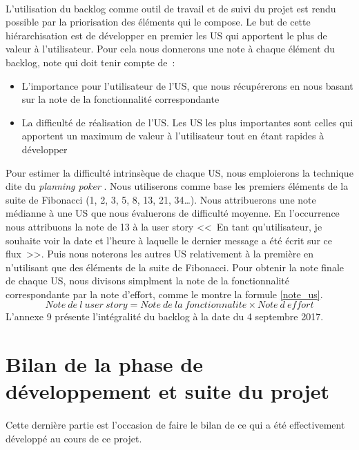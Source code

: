 			\paragraph{}%
			L'utilisation du backlog comme outil de travail et de suivi du projet est
			rendu possible par la priorisation des éléments qui le compose. Le but de
			cette hiérarchisation est de développer en premier les US qui
			apportent le plus de valeur à l'utilisateur. Pour cela nous donnerons
			une note à chaque élément du backlog, note qui doit tenir compte de~:
			\begin{itemize}
			  \item L'importance pour l'utilisateur de l'US, que nous
			  récupérerons en nous basant sur la note de la fonctionnalité correspondante
			  \item La difficulté de réalisation de l'US. Les US les
			  plus importantes sont celles qui apportent un maximum de valeur à
			  l'utilisateur tout en étant rapides à développer
			\end{itemize}
			Pour estimer la difficulté intrinsèque de chaque US,
			nous emploierons la technique dite du \textit{planning poker}
			\citep{aubry_scrum_2015}. Nous utiliserons comme base les premiers éléments
			de la suite de Fibonacci (1, 2, 3, 5, 8, 13, 21, 34\ldots). Nous
			attribuerons une note médianne à une US que nous évaluerons de
			difficulté moyenne. En l'occurrence nous attribuons la note de 13 à la user
			story <<~En tant qu'utilisateur, je souhaite voir la date et l'heure à
			laquelle le dernier message a été écrit sur ce flux~>>.
			Puis nous noterons les autres US relativement à la première en
			n'utilisant que des éléments de la suite de Fibonacci.\newline
			Pour obtenir la note finale de chaque US, nous divisons simplment la
			note de la fonctionnalité correspondante par la note d'effort, comme le
			montre la formule \ref{note_us}.
			\begin{equation}
				\label{note_us}
				Note\ de\ l\ user\ story=Note\ de\ la\ fonctionnalite \times Note\ d\ effort
			\end{equation}
			L'annexe 9 présente l'intégralité du backlog à la date du 4 septembre 2017.
	
	\section{Bilan de la phase de développement et suite du projet}
		\paragraph{}
		Cette dernière partie est l'occasion de faire le bilan de ce qui a été
		effectivement développé au cours de ce projet.
		
